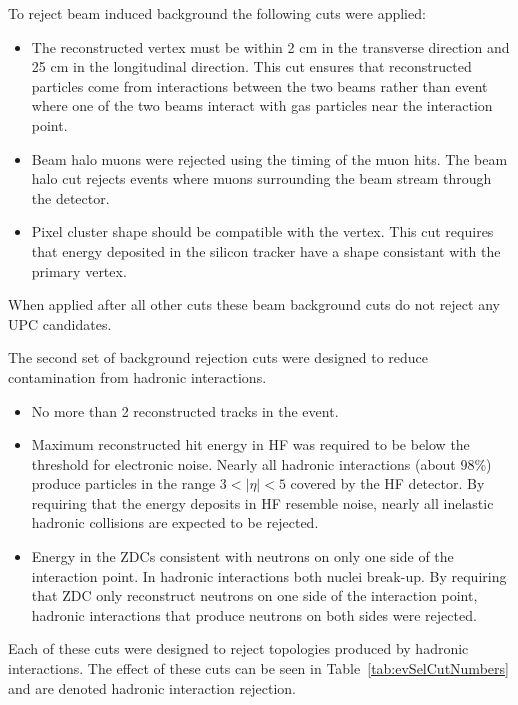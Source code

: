       To reject beam induced background the following cuts were applied:
      \begin{itemize}
        \item The reconstructed vertex must be within 2 cm in 
          the transverse direction and 25 cm in the 
          longitudinal direction. This cut ensures that reconstructed particles 
          come from interactions between the two beams rather than event where 
          one of the two beams interact with gas particles near the interaction 
          point. 
  	    \item Beam halo muons were rejected using the timing of the muon hits.
          The beam halo cut rejects events where muons surrounding the beam 
          stream through the detector. 
  	    \item Pixel cluster shape should be compatible with the vertex. 
          This cut requires that energy deposited in the silicon tracker have a
            shape consistant with the primary vertex. 
      \end{itemize}
      When applied after all other cuts these beam background cuts do not reject
        any UPC \JPsi{} candidates. 

      The second set of background rejection cuts were designed to 
        reduce contamination from hadronic interactions. 
      \begin{itemize}
  	    \item No more than 2 reconstructed tracks in the event.
  	    \item Maximum reconstructed hit energy in HF was required to be below 
            the threshold for electronic noise. 
          Nearly all hadronic interactions (about 98\%) produce particles in 
            the range $3<|\eta|<5$ covered by the HF detector.
          By requiring that the energy deposits in HF resemble noise, nearly all
            inelastic hadronic collisions are expected to be rejected.
  	    \item Energy in the ZDCs consistent with neutrons on only one side 
            of the interaction point.
          In hadronic interactions both nuclei break-up. 
          By requiring that ZDC only reconstruct neutrons on one side of the 
            interaction point, hadronic interactions that produce neutrons on 
            both sides were rejected.
      \end{itemize}
      Each of these cuts were designed to reject topologies produced by 
        hadronic interactions.
      The effect of these cuts can be seen in Table~\ref{tab:evSelCutNumbers} 
        and are denoted hadronic interaction rejection. 

